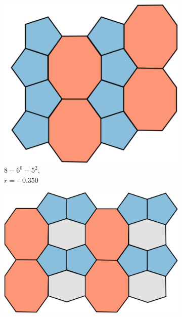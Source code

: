\begin{figure}[h!]
     \centering
     
	\begin{subfigure}[b]{0.15\textwidth}
         \centering
         \includegraphics[width=\textwidth]{./appendices/figures/crystal_8_60_52.pdf}
         \caption{$8 - 6^0 - 5^2$, \\$r=-0.350$}
         \label{appfig:86052}
     \end{subfigure}
     \hfill
      \begin{subfigure}[b]{0.15\textwidth}
         \centering
         \includegraphics[width=\textwidth]{./appendices/figures/crystal_8_61_52.pdf}

\end{subfigure}
\end{figure}
